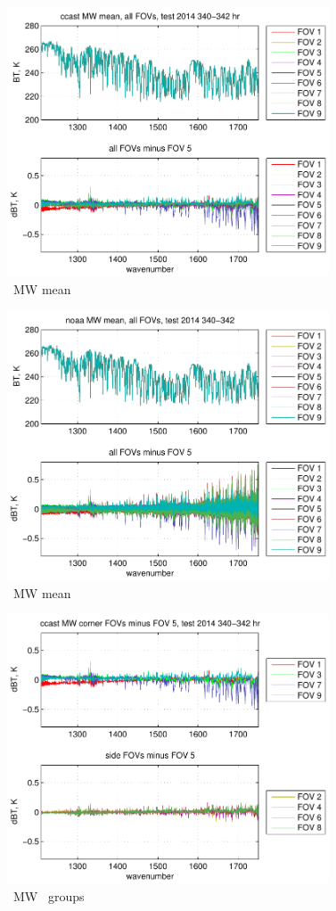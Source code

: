 \documentclass[12pt]{article}
\begin{document}
\begin{figure}
  \centering
  \includegraphics[height=8cm]{figures/ccast_MW_avg_2014_340-342_hr.pdf}
  \caption{\ccast\ MW mean}
\end{figure}  


\begin{figure}
  \centering
  \includegraphics[height=8cm]{figures/noaa_MW_avg_2014_340-342.pdf}
  \caption{\noaa\ MW mean}
\end{figure}


\begin{figure}
  \centering
  \includegraphics[height=8cm]{figures/ccast_MW_dif_2014_340-342_hr.pdf}
  \caption{\ccast\ MW \fov\ groups}
\end{figure}
\end{document}
